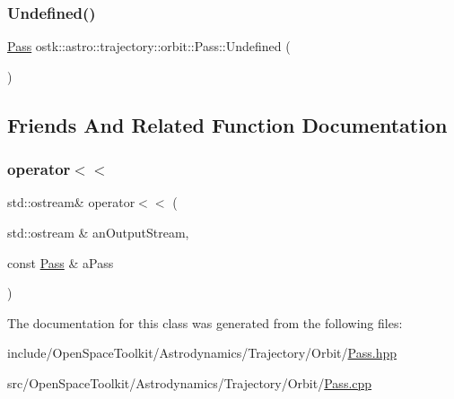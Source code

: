 \mbox{\label{classostk_1_1astro_1_1trajectory_1_1orbit_1_1_pass_ad1f97ee5361bce2ea9d3dd2211fa52bc}} 
\subsubsection{\texorpdfstring{Undefined()}{Undefined()}}
{\footnotesize\ttfamily \hyperlink{classostk_1_1astro_1_1trajectory_1_1orbit_1_1_pass}{Pass} ostk\+::astro\+::trajectory\+::orbit\+::\+Pass\+::\+Undefined (\begin{DoxyParamCaption}{ }\end{DoxyParamCaption})\hspace{0.3cm}{\ttfamily [static]}}



\subsection{Friends And Related Function Documentation}
\mbox{\label{classostk_1_1astro_1_1trajectory_1_1orbit_1_1_pass_a62c2257085205d3c714c5ca4350f84f4}} 
\subsubsection{\texorpdfstring{operator$<$$<$}{operator<<}}
{\footnotesize\ttfamily std\+::ostream\& operator$<$$<$ (\begin{DoxyParamCaption}\item[{std\+::ostream \&}]{an\+Output\+Stream,  }\item[{const \hyperlink{classostk_1_1astro_1_1trajectory_1_1orbit_1_1_pass}{Pass} \&}]{a\+Pass }\end{DoxyParamCaption})\hspace{0.3cm}{\ttfamily [friend]}}



The documentation for this class was generated from the following files\+:\begin{DoxyCompactItemize}
\item 
include/\+Open\+Space\+Toolkit/\+Astrodynamics/\+Trajectory/\+Orbit/\hyperlink{_pass_8hpp}{Pass.\+hpp}\item 
src/\+Open\+Space\+Toolkit/\+Astrodynamics/\+Trajectory/\+Orbit/\hyperlink{_pass_8cpp}{Pass.\+cpp}\end{DoxyCompactItemize}
